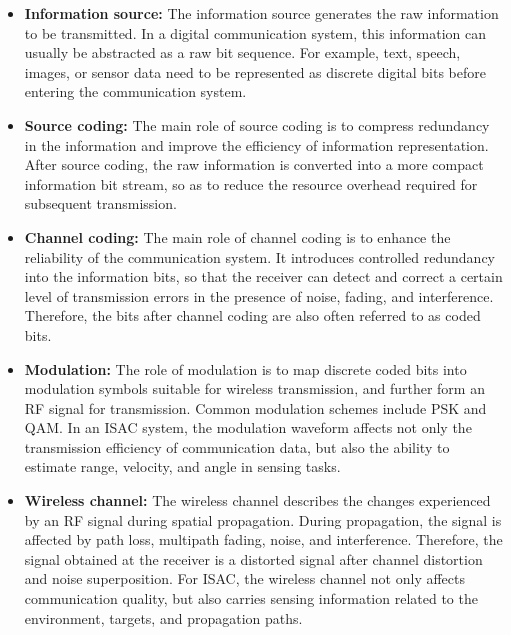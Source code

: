 \begin{itemize}
    \item \textbf{Information source:}
    The information source generates the raw information to be transmitted.
    In a digital communication system,
    this information can usually be abstracted as a raw bit sequence.
    For example,
    text,
speech,
images,
or sensor data need to be represented as discrete digital bits
    before entering the communication system.

    \item \textbf{Source coding:}
    The main role of source coding is to compress redundancy in the information
    and improve the efficiency of information representation.
    After source coding,
    the raw information is converted into a more compact information bit stream,
    so as to reduce the resource overhead required for subsequent transmission.

    \item \textbf{Channel coding:}
    The main role of channel coding is to enhance the reliability of the communication system.
    It introduces controlled redundancy into the information bits,
    so that the receiver can detect and correct a certain level of transmission errors
    in the presence of noise,
fading,
and interference.
    Therefore,
    the bits after channel coding are also often referred to as coded bits.

    \item \textbf{Modulation:}
    The role of modulation is to map discrete coded bits into modulation symbols
    suitable for wireless transmission,
    and further form an RF signal for transmission.
    Common modulation schemes include PSK and QAM.
    In an ISAC system,
    the modulation waveform affects not only the transmission efficiency of communication data,
    but also the ability to estimate range,
velocity,
and angle in sensing tasks.

    \item \textbf{Wireless channel:}
    The wireless channel describes the changes experienced by an RF signal during spatial propagation.
    During propagation,
    the signal is affected by path loss,
multipath fading,
noise,
and interference.
    Therefore,
    the signal obtained at the receiver is a distorted signal after channel distortion
    and noise superposition.
    For ISAC,
    the wireless channel not only affects communication quality,
    but also carries sensing information related to the environment,
targets,
and propagation paths.


\end{itemize}
